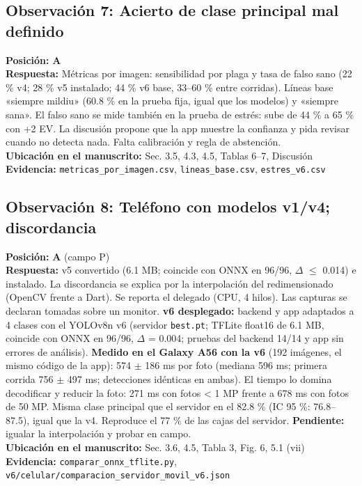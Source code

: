 \documentclass[11pt,a4paper]{article}
\begin{document}
\subsection*{Observación 7: Acierto de clase principal mal definido}
\noindent\textbf{Posición:} \textbf{A}\\
\textbf{Respuesta:} Métricas por imagen: sensibilidad por plaga y tasa de falso sano (22 \% v4; 28 \% v5 instalado; 44 \% v6 base, 33–60 \% entre corridas). Líneas base «siempre mildiu» (60.8 \% en la prueba fija, igual que los modelos) y «siempre sana». El falso sano se mide también en la prueba de estrés: sube de 44 \% a 65 \% con +2 EV. La discusión propone que la app muestre la confianza y pida revisar cuando no detecta nada. Falta calibración y regla de abstención.\\
\textbf{Ubicación en el manuscrito:} Sec. 3.5, 4.3, 4.5, Tablas 6–7, Discusión\\
\textbf{Evidencia:} \texttt{metricas\_por\_imagen.csv}, \texttt{lineas\_base.csv}, \texttt{estres\_v6.csv}

\subsection*{Observación 8: Teléfono con modelos v1/v4; discordancia}
\noindent\textbf{Posición:} \textbf{A} (campo P)\\
\textbf{Respuesta:} v5 convertido (6.1 MB; coincide con ONNX en 96/96, $\Delta$ $\leq$ 0.014) e instalado. La discordancia se explica por la interpolación del redimensionado (OpenCV frente a Dart). Se reporta el delegado (CPU, 4 hilos). Las capturas se declaran tomadas sobre un monitor. \textbf{v6 desplegado:} backend y app adaptados a 4 clases con el YOLOv8n v6 (servidor \texttt{best.pt}; TFLite float16 de 6.1 MB, coincide con ONNX en 96/96, $\Delta$ = 0.004; pruebas del backend 14/14 y app sin errores de análisis). \textbf{Medido en el Galaxy A56 con la v6} (192 imágenes, el mismo código de la app): 574 $\pm$ 186 ms por foto (mediana 596 ms; primera corrida 756 $\pm$ 497 ms; detecciones idénticas en ambas). El tiempo lo domina decodificar y reducir la foto: 271 ms con fotos < 1 MP frente a 678 ms con fotos de 50 MP. Misma clase principal que el servidor en el 82.8 \% (IC 95 \%: 76.8–87.5), igual que la v4. Reproduce el 77 \% de las cajas del servidor. \textbf{Pendiente:} igualar la interpolación y probar en campo.\\
\textbf{Ubicación en el manuscrito:} Sec. 3.6, 4.5, Tabla 3, Fig. 6, 5.1 (vii)\\
\textbf{Evidencia:} \texttt{comparar\_onnx\_tflite.py}, \texttt{v6/celular/comparacion\_servidor\_movil\_v6.json}
\end{document}
